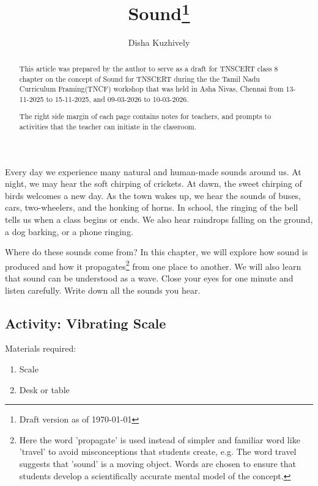 \documentclass{xtufte-handout}
\title{Sound\thanks{Draft version as of \today}}
\author[dishajk]{Disha Kuzhively}
\begin{document}
\maketitle%

\begin{abstract}
\noindent
This article was prepared by the author to serve as a draft for TNSCERT class 8 chapter on the concept of Sound for TNSCERT during the the Tamil Nadu Curriculum Framing(TNCF) workshop that was held in Asha Nivas, Chennai  from 13-11-2025 to 15-11-2025, and 09-03-2026 to 10-03-2026.

The right side margin of each page contains notes for teachers, and prompts to activities that the teacher can initiate in the classroom.
\end{abstract}


Every day we experience many natural and human-made sounds around us. At night, we may hear the soft chirping of crickets. At dawn, the sweet chirping of birds welcomes a new day. As the town wakes up, we hear the sounds of buses, cars, two-wheelers, and the honking of horns. In school, the ringing of the bell tells us when a class begins or ends. We also hear raindrops falling on the ground, a dog barking, or a phone ringing.

Where do these sounds come from? In this chapter, we will explore how sound is produced and how it propagates\footnote{Here the word 'propagate' is used instead of simpler and familiar word like 'travel' to avoid misconceptions that students create, e.g. The word travel suggests that 'sound' is a moving object. Words are chosen to ensure that students develop a scientifically accurate mental model of the concept.} from one place to another. We will also learn that sound can be understood as a wave.
Close your eyes for one minute and listen carefully. Write down all the sounds you hear.

\subsection{Activity: Vibrating Scale}

Materials required:
\begin{enumerate}
    \item Scale
    \item Desk or table
\end{enumerate}
\end{document}
